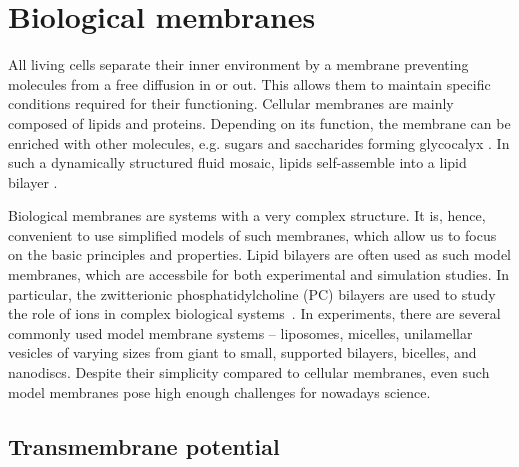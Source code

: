 \chapter{Biological membranes}
\label{chap:intro}


All living cells separate their inner environment by a membrane 
preventing molecules from a free diffusion in or out. 
This allows them to maintain specific conditions required for their functioning. 
Cellular membranes are mainly composed of lipids and proteins. 
Depending on its function, the membrane can be enriched with other molecules, e.g. sugars and saccharides forming glycocalyx \citep{reitsma07}. 
In such a dynamically structured fluid mosaic,  %
lipids self-assemble into a lipid bilayer \citep{vereb03,Mouritsen2011,Vattulainen2011}.

Biological membranes are systems with a very complex structure. 
It is, hence, convenient to use simplified models of such membranes, 
which allow us to focus on the basic principles and properties. 
Lipid bilayers are often used as such model membranes,
which are accessbile for both experimental and simulation studies. 
In particular, the zwitterionic phosphatidylcholine (PC) bilayers are
used to study the role of ions in complex biological
systems~\citep{scherer87,seelig90,cevc90}.
In experiments, there are several commonly used model membrane systems --
liposomes, 
micelles, 
unilamellar vesicles of varying sizes from giant to small, 
supported bilayers,
bicelles,
and nanodiscs. \citep{keller2017, MolBiolCell, marsh13}
Despite their simplicity compared to cellular membranes,
even such model membranes pose high enough challenges for nowadays science. 
\citep{pohl18, melcrova16, javanainen17, magarkar2017, botan15, catte16, Kulig14b, Kulig14, Pluhackova2016, vacha09a}




\section{Transmembrane potential}

